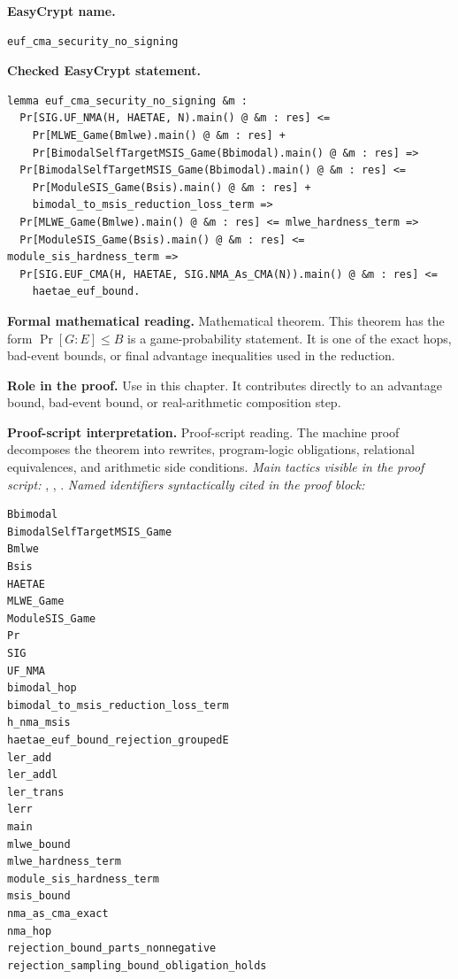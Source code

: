 \begin{formaltheorem}
\noindent\textbf{EasyCrypt name.}
\begin{lstlisting}[language=EasyCrypt,basicstyle=\ttfamily\scriptsize]
euf_cma_security_no_signing
\end{lstlisting}
\noindent\textbf{Checked EasyCrypt statement.}
\begin{lstlisting}[language=EasyCrypt,basicstyle=\ttfamily\scriptsize]
lemma euf_cma_security_no_signing &m :
  Pr[SIG.UF_NMA(H, HAETAE, N).main() @ &m : res] <=
    Pr[MLWE_Game(Bmlwe).main() @ &m : res] +
    Pr[BimodalSelfTargetMSIS_Game(Bbimodal).main() @ &m : res] =>
  Pr[BimodalSelfTargetMSIS_Game(Bbimodal).main() @ &m : res] <=
    Pr[ModuleSIS_Game(Bsis).main() @ &m : res] +
    bimodal_to_msis_reduction_loss_term =>
  Pr[MLWE_Game(Bmlwe).main() @ &m : res] <= mlwe_hardness_term =>
  Pr[ModuleSIS_Game(Bsis).main() @ &m : res] <= module_sis_hardness_term =>
  Pr[SIG.EUF_CMA(H, HAETAE, SIG.NMA_As_CMA(N)).main() @ &m : res] <=
    haetae_euf_bound.
\end{lstlisting}
\noindent\textbf{Formal mathematical reading.}
Mathematical theorem. This theorem has the form \(\Pr[G:E] \le B\) is a game-probability statement.  It is one of the exact hops, bad-event bounds, or final advantage inequalities used in the reduction.

\noindent\textbf{Role in the proof.}
Use in this chapter. It contributes directly to an advantage bound, bad-event bound, or real-arithmetic composition step.

\noindent\textbf{Proof-script interpretation.}
Proof-script reading. The machine proof decomposes the theorem into rewrites, program-logic obligations, relational equivalences, and arithmetic side conditions.
\emph{Main tactics visible in the proof script:} , , .
\emph{Named identifiers syntactically cited in the proof block:}
\begin{lstlisting}[language=EasyCrypt,basicstyle=\ttfamily\scriptsize]
Bbimodal
BimodalSelfTargetMSIS_Game
Bmlwe
Bsis
HAETAE
MLWE_Game
ModuleSIS_Game
Pr
SIG
UF_NMA
bimodal_hop
bimodal_to_msis_reduction_loss_term
h_nma_msis
haetae_euf_bound_rejection_groupedE
ler_add
ler_addl
ler_trans
lerr
main
mlwe_bound
mlwe_hardness_term
module_sis_hardness_term
msis_bound
nma_as_cma_exact
nma_hop
rejection_bound_parts_nonnegative
rejection_sampling_bound_obligation_holds
\end{lstlisting}

\end{formaltheorem}

